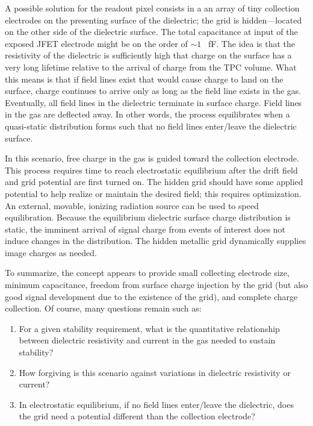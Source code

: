 A possible solution for the readout pixel consists in a an array of 
tiny collection electrodes on the presenting surface of the dielectric; the grid is hidden---located on the other side of the dielectric surface.   The total capacitance at input of the exposed JFET electrode might be on the order of $\sim 1$~ fF.  The idea is that the resistivity of the dielectric is sufficiently high that charge on the surface has a very long lifetime relative to the arrival of charge from the TPC volume.  What this means is that if field lines exist that would cause charge to land on the surface, charge continues to arrive only as long as the field line exists in the gas. Eventually, all field lines in the dielectric terminate in surface charge. Field lines in the gas are deflected away.  In other words, the process equilibrates when a quasi-static distribution forms such that no field lines enter/leave the dielectric surface.   

In this scenario, free charge in the gas is guided toward the collection electrode. This process  requires time to reach electrostatic equilibrium after the drift field and grid potential are first turned on. The hidden grid should have some applied potential to help realize or maintain the desired field; this requires optimization. An external, movable, ionizing radiation source can be used to speed equilibration.  Because the equilibrium dielectric surface charge distribution is static, the imminent arrival of signal charge from events of interest does not induce changes in the distribution.  The hidden metallic grid dynamically supplies image charges as needed.

To summarize, the concept appears to provide small collecting electrode size, minimum capacitance, 
freedom from surface charge injection by the grid (but also good signal development due to the existence of the grid), and complete charge collection.  Of course, many questions remain such as: 
\begin{enumerate}
\item For a given stability requirement, what is the quantitative relationship between dielectric resistivity and current in the gas needed to sustain stability? 
\item How forgiving is this scenario against variations in dielectric resistivity or current?
\item In electrostatic equilibrium, if no field lines enter/leave the dielectric, does the grid need a potential different than the collection electrode? 
\end{enumerate}


